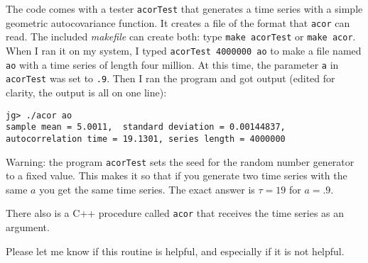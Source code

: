 \documentclass{article}
\begin{document}
The code comes with a tester {\tt acorTest} that generates a time series with a
simple geometric autocovariance function.  
It creates a file of the format that {\tt acor} can read.
The included {\em makefile} can create both: type {\tt make acorTest} or 
{\tt make acor}.
When I ran it on my system, I typed {\tt acorTest 4000000 ao} to make a file named
{\tt ao} with a time series of length four million.
At this time, the parameter {\tt a} in {\tt acorTest} was set to {\tt .9}.
Then I ran the program and got output (edited for clarity, the output is all on 
one line):
\begin{verbatim}
jg> ./acor ao
sample mean = 5.0011,  standard deviation = 0.00144837,  
autocorrelation time = 19.1301, series length = 4000000
\end{verbatim}
Warning: the program {\tt acorTest} sets the seed for the random number generator
to a fixed value.
This makes it so that if you generate two time series with the same $a$ you 
get the same time series.
The exact answer is $\tau = 19$ for $a=.9$.

There also is a C++ procedure called {\tt acor} that receives the time series
as an argument.  

Please let me know if this routine is helpful, and especially if it is not helpful.
\end{document}
